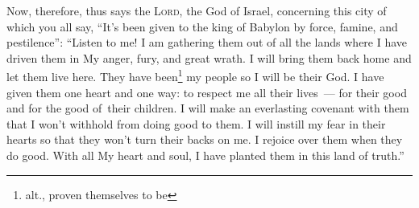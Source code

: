 
\begin{inparaenum}
    
    
    
     Now, therefore, thus says the \textsc{Lord}, the God of Israel, concerning this city of which you all say, ``It's been given to the king of Babylon by force, famine, and pestilence'':%
     ``Listen to me! I am gathering them out of all the lands where I have driven them in My anger, fury, and great wrath. I will bring them back home and let them live here.%
     They have been\footnote{alt., proven themselves to be} my people so I will be their God.%
     I have given them one heart and one way: to respect me all their lives~--- for their good and for the good of\understood\ their children.%
     I will make an everlasting covenant with them that I won't withhold from doing good to them. I will instill my fear in their hearts so that they won't turn their backs on me.%
     I rejoice over them when they do good. With all My heart and soul, I have planted them in this land of truth.''%
    
\end{inparaenum}
